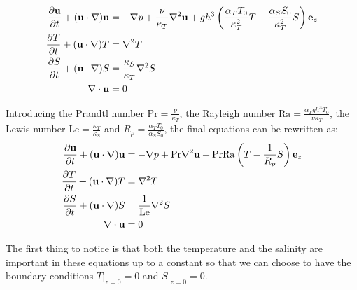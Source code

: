 \documentclass{article}
\def\Ra{\mathrm{Ra}}
\def\Pr{\mathrm{Pr}}
\def\Le{\mathrm{Le}}
\begin{document}
\begin{equation}
  \begin{aligned}
    \frac{\partial\mathbf{u}}{\partial t} + (\mathbf{u}\cdot\nabla)\mathbf{u} & = -\nabla p + \frac{\nu}{\kappa_T}\nabla^2\mathbf{u} + g h^3\left(\frac{\alpha_T T_0}{\kappa_T^2} T - \frac{\alpha_S S_0}{\kappa_T^2} S\right)\boldsymbol{\mathrm{e}}_z \\
    \frac{\partial T}{\partial t} + (\mathbf{u}\cdot\nabla)T                  & = \nabla^2T                                                                                                                                            \\
    \frac{\partial S}{\partial t} + (\mathbf{u}\cdot\nabla)S                  & = \frac{\kappa_S}{\kappa_T}\nabla^2S                                                                                                                   \\
    \nabla\cdot\mathbf{u}                                                     & = 0
  \end{aligned}
\end{equation}

Introducing the Prandtl number $\Pr = \frac{\nu}{\kappa_T}$, the Rayleigh number $\Ra = \frac{\alpha_T g h^3 T_0}{\nu \kappa_T}$, the Lewis number $\Le = \frac{\kappa_T}{\kappa_S}$ and $R_{\rho} = \frac{\alpha_T T_0}{\alpha_S S_0}$, the final equations can be rewritten as:
\begin{equation}\label{eq:ns}
  \begin{aligned}
    \frac{\partial\mathbf{u}}{\partial t} + (\mathbf{u}\cdot\nabla)\mathbf{u} & = -\nabla p + \Pr\nabla^2\mathbf{u} + \Pr\Ra\left(T - \frac{1}{R_{\rho}}S\right)\vf{e}_z \\
    \frac{\partial T}{\partial t} + (\mathbf{u}\cdot\nabla)T                  & = \nabla^2T                                                                              \\
    \frac{\partial S}{\partial t} + (\mathbf{u}\cdot\nabla)S                  & = \frac{1}{\Le}\nabla^2S                                                                 \\
    \nabla\cdot\mathbf{u}                                                     & = 0
  \end{aligned}
\end{equation}

The first thing to notice is that both the temperature and the salinity are important in these equations up to a constant so that we can choose to have the boundary conditions $T|_{z=0} = 0$ and $S|_{z=0} = 0$.
\end{document}
